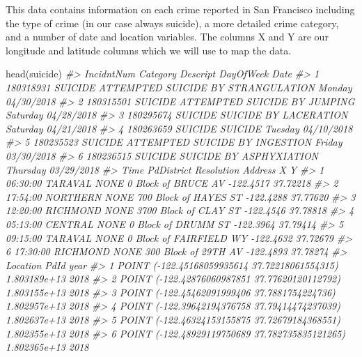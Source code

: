 \documentclass[
]{krantz}
\makeatletter
\newenvironment{Shaded}{\begin{snugshade}}{\end{snugshade}}
\newcommand{\CommentTok}[1]{\textcolor[rgb]{0.37,0.37,0.37}{\textit{#1}}}
\newcommand{\FunctionTok}[1]{\textcolor[rgb]{0,0,0}{#1}}
\newcommand{\NormalTok}[1]{#1}
\newenvironment{kframe}{%
\medskip{}
\setlength{\fboxsep}{.8em}
 \def\at@end@of@kframe{}%
 \ifinner\ifhmode%
  \def\at@end@of@kframe{\end{minipage}}%
  \begin{minipage}{\columnwidth}%
 \fi\fi%
 \def\FrameCommand##1{\hskip\@totalleftmargin \hskip-\fboxsep
 \colorbox{shadecolor}{##1}\hskip-\fboxsep
     \hskip-\linewidth \hskip-\@totalleftmargin \hskip\columnwidth}%
 \MakeFramed {\advance\hsize-\width
   \@totalleftmargin\z@ \linewidth\hsize
   \@setminipage}}%
 {\par\unskip\endMakeFramed%
 \at@end@of@kframe}
\renewenvironment{Shaded}{\begin{kframe}}{\end{kframe}}
\makeatother
\begin{document}
This data contains information on each crime reported in San Francisco including the type of crime (in our case always suicide), a more detailed crime category, and a number of date and location variables. The columns X and Y are our longitude and latitude columns which we will use to map the data.

\begin{Shaded}
\begin{Highlighting}[]
\FunctionTok{head}\NormalTok{(suicide)}
\CommentTok{\#\textgreater{}   IncidntNum Category                           Descript DayOfWeek       Date}
\CommentTok{\#\textgreater{} 1  180318931  SUICIDE ATTEMPTED SUICIDE BY STRANGULATION    Monday 04/30/2018}
\CommentTok{\#\textgreater{} 2  180315501  SUICIDE       ATTEMPTED SUICIDE BY JUMPING  Saturday 04/28/2018}
\CommentTok{\#\textgreater{} 3  180295674  SUICIDE              SUICIDE BY LACERATION  Saturday 04/21/2018}
\CommentTok{\#\textgreater{} 4  180263659  SUICIDE                            SUICIDE   Tuesday 04/10/2018}
\CommentTok{\#\textgreater{} 5  180235523  SUICIDE     ATTEMPTED SUICIDE BY INGESTION    Friday 03/30/2018}
\CommentTok{\#\textgreater{} 6  180236515  SUICIDE            SUICIDE BY ASPHYXIATION  Thursday 03/29/2018}
\CommentTok{\#\textgreater{}       Time PdDistrict Resolution                 Address         X        Y}
\CommentTok{\#\textgreater{} 1 06:30:00    TARAVAL       NONE     0 Block of BRUCE AV {-}122.4517 37.72218}
\CommentTok{\#\textgreater{} 2 17:54:00   NORTHERN       NONE   700 Block of HAYES ST {-}122.4288 37.77620}
\CommentTok{\#\textgreater{} 3 12:20:00   RICHMOND       NONE   3700 Block of CLAY ST {-}122.4546 37.78818}
\CommentTok{\#\textgreater{} 4 05:13:00    CENTRAL       NONE     0 Block of DRUMM ST {-}122.3964 37.79414}
\CommentTok{\#\textgreater{} 5 09:15:00    TARAVAL       NONE 0 Block of FAIRFIELD WY {-}122.4632 37.72679}
\CommentTok{\#\textgreater{} 6 17:30:00   RICHMOND       NONE    300 Block of 29TH AV {-}122.4893 37.78274}
\CommentTok{\#\textgreater{}                                         Location         PdId year}
\CommentTok{\#\textgreater{} 1  POINT ({-}122.45168059935614 37.72218061554315) 1.803189e+13 2018}
\CommentTok{\#\textgreater{} 2  POINT ({-}122.42876060987851 37.77620120112792) 1.803155e+13 2018}
\CommentTok{\#\textgreater{} 3   POINT ({-}122.45462091999406 37.7881754224736) 1.802957e+13 2018}
\CommentTok{\#\textgreater{} 4  POINT ({-}122.39642194376758 37.79414474237039) 1.802637e+13 2018}
\CommentTok{\#\textgreater{} 5  POINT ({-}122.46324153155875 37.72679184368551) 1.802355e+13 2018}
\CommentTok{\#\textgreater{} 6 POINT ({-}122.48929119750689 37.782735835121265) 1.802365e+13 2018}
\end{Highlighting}
\end{Shaded}
\end{document}
